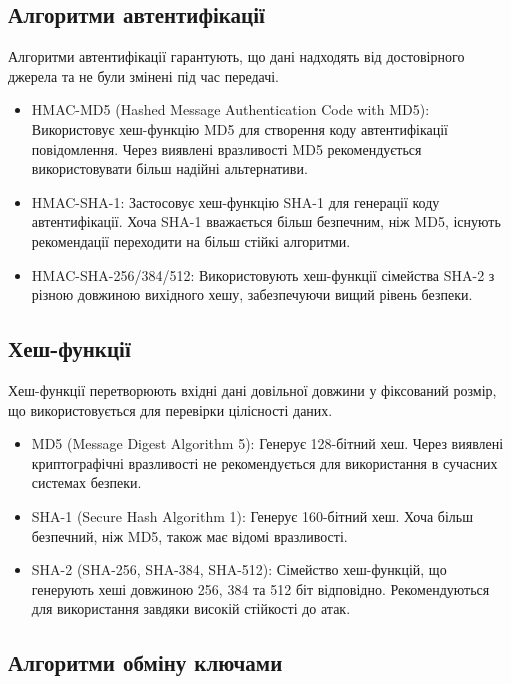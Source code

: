 \subsection{Алгоритми автентифікації}

Алгоритми автентифікації гарантують, що дані надходять від достовірного джерела та не були змінені під час передачі.

\begin{itemize}
    \item HMAC-MD5 (Hashed Message Authentication Code with MD5): Використовує хеш-функцію MD5 для створення коду автентифікації повідомлення. Через виявлені вразливості MD5 рекомендується використовувати більш надійні альтернативи.

    \item HMAC-SHA-1: Застосовує хеш-функцію SHA-1 для генерації коду автентифікації. Хоча SHA-1 вважається більш безпечним, ніж MD5, існують рекомендації переходити на більш стійкі алгоритми.

    \item HMAC-SHA-256/384/512: Використовують хеш-функції сімейства SHA-2 з різною довжиною вихідного хешу, забезпечуючи вищий рівень безпеки.
\end{itemize}

\subsection{Хеш-функції}

Хеш-функції перетворюють вхідні дані довільної довжини у фіксований розмір, що використовується для перевірки цілісності даних.

\begin{itemize}
    \item MD5 (Message Digest Algorithm 5): Генерує 128-бітний хеш. Через виявлені криптографічні вразливості не рекомендується для використання в сучасних системах безпеки.
    \item SHA-1 (Secure Hash Algorithm 1): Генерує 160-бітний хеш. Хоча більш безпечний, ніж MD5, також має відомі вразливості.
    \item SHA-2 (SHA-256, SHA-384, SHA-512): Сімейство хеш-функцій, що генерують хеші довжиною 256, 384 та 512 біт відповідно. Рекомендуються для використання завдяки високій стійкості до атак.
\end{itemize}

\subsection{Алгоритми обміну ключами}

